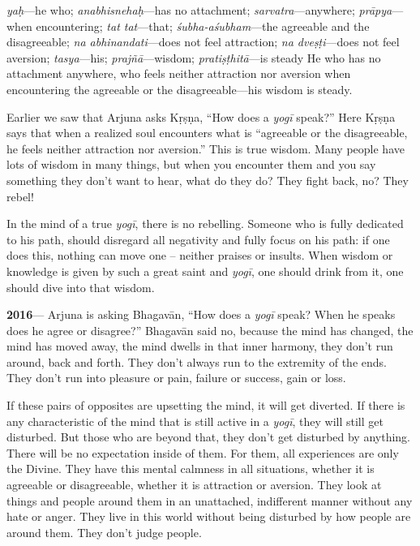 {%
  \textit{yaḥ}---he who; 
  \textit{anabhisnehaḥ}---has no attachment; 
  \textit{sarvatra}---anywhere; 
  \textit{prāpya}---when encountering; 
  \textit{tat tat}---that; 
  \textit{śubha-aśubham}---the agreeable and the disagreeable; 
  \textit{na abhinandati}---does not feel attraction; 
  \textit{na dveṣṭi}---does not feel aversion; 
  \textit{tasya}---his; 
  \textit{prajñā}---wisdom; 
  \textit{pratiṣṭhitā}---is steady
}
{%
  He who has no attachment anywhere, who feels neither attraction nor aversion when encountering the agreeable or the disagreeable—his wisdom is steady.
}

Earlier we saw that Arjuna asks Kṛṣṇa, “How does a \textit{yogī} speak?” Here Kṛṣṇa says that when a realized soul encounters what is “agreeable or the disagreeable, he feels neither attraction nor aversion.” This is true wisdom. Many people have lots of wisdom in many things, but when you encounter them and you say something they don’t want to hear, what do they do? They fight back, no? They rebel!

In the mind of a true \textit{yogī}, there is no rebelling. Someone who is fully dedicated to his path, should disregard all negativity and fully focus on his path: if one does this, nothing can move one – neither praises or insults. When wisdom or knowledge is given by such a great saint and \textit{yogī}, one should drink from it, one should dive into that wisdom.

\textbf{2016}--- Arjuna is asking Bhagavān, “How does a \textit{yogī} speak? When he speaks does he agree or disagree?” Bhagavān said no, because the mind has changed, the mind has moved away, the mind dwells in that inner harmony, they don’t run around, back and forth. They don’t always run to the extremity of the ends. They don’t run into pleasure or pain, failure or success, gain or loss.

If these pairs of opposites are upsetting the mind, it will get diverted. If there is any characteristic of the mind that is still active in a \textit{yogī}, they will still get disturbed. But those who are beyond that, they don’t get disturbed by anything. There will be no expectation inside of them. For them, all experiences are only the Divine. They have this mental calmness in all situations, whether it is agreeable or disagreeable, whether it is attraction or aversion. They look at things and people around them in an unattached, indifferent manner without any hate or anger. They live in this world without being disturbed by how people are around them. They don’t judge people.


